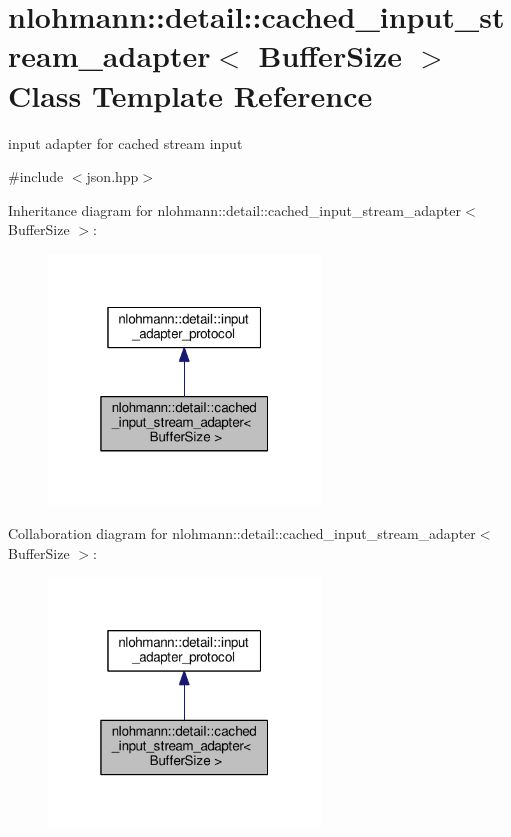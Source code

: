 \hypertarget{classnlohmann_1_1detail_1_1cached__input__stream__adapter}{}\section{nlohmann\+:\+:detail\+:\+:cached\+\_\+input\+\_\+stream\+\_\+adapter$<$ Buffer\+Size $>$ Class Template Reference}
\label{classnlohmann_1_1detail_1_1cached__input__stream__adapter}


input adapter for cached stream input  




{\ttfamily \#include $<$json.\+hpp$>$}



Inheritance diagram for nlohmann\+:\+:detail\+:\+:cached\+\_\+input\+\_\+stream\+\_\+adapter$<$ Buffer\+Size $>$\+:\nopagebreak
\begin{figure}[H]
\begin{center}
\leavevmode
\includegraphics[width=205pt]{classnlohmann_1_1detail_1_1cached__input__stream__adapter__inherit__graph}
\end{center}
\end{figure}


Collaboration diagram for nlohmann\+:\+:detail\+:\+:cached\+\_\+input\+\_\+stream\+\_\+adapter$<$ Buffer\+Size $>$\+:\nopagebreak
\begin{figure}[H]
\begin{center}
\leavevmode
\includegraphics[width=205pt]{classnlohmann_1_1detail_1_1cached__input__stream__adapter__coll__graph}
\end{center}
\end{figure}
